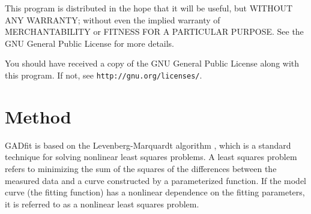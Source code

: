 \documentclass{article}
\begin{document}
This program is distributed in the hope that it will be useful, but
WITHOUT ANY WARRANTY; without even the implied warranty of
MERCHANTABILITY or FITNESS FOR A PARTICULAR PURPOSE.  See the GNU
General Public License for more details.

You should have received a copy of the GNU General Public License
along with this program.  If not, see
\texttt{http://gnu.org/licenses/}.

\section{Method}

GADfit is based on the Levenberg-Marquardt algorithm
\cite{marquardt63}, which is a standard technique for solving
nonlinear least squares problems. A least squares problem refers to
minimizing the sum of the squares of the differences between the
measured data and a curve constructed by a parameterized function. If
the model curve (the fitting function) has a nonlinear dependence on
the fitting parameters, it is referred to as a nonlinear least squares
problem.
\end{document}
